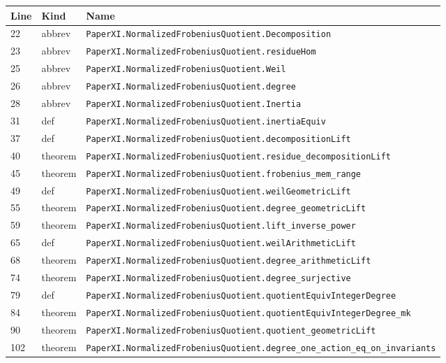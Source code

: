 \documentclass[10pt,oneside]{book}
\begin{document}
\begin{longtable}{@{}p{}p{}p{}@{}}\toprule Line&Kind&Name\\\midrule\endhead

22&abbrev&\nolinkurl{PaperXI.NormalizedFrobeniusQuotient.Decomposition}\\

23&abbrev&\nolinkurl{PaperXI.NormalizedFrobeniusQuotient.residueHom}\\

25&abbrev&\nolinkurl{PaperXI.NormalizedFrobeniusQuotient.Weil}\\

26&abbrev&\nolinkurl{PaperXI.NormalizedFrobeniusQuotient.degree}\\

28&abbrev&\nolinkurl{PaperXI.NormalizedFrobeniusQuotient.Inertia}\\

31&def&\nolinkurl{PaperXI.NormalizedFrobeniusQuotient.inertiaEquiv}\\

37&def&\nolinkurl{PaperXI.NormalizedFrobeniusQuotient.decompositionLift}\\

40&theorem&\nolinkurl{PaperXI.NormalizedFrobeniusQuotient.residue_decompositionLift}\\

45&theorem&\nolinkurl{PaperXI.NormalizedFrobeniusQuotient.frobenius_mem_range}\\

49&def&\nolinkurl{PaperXI.NormalizedFrobeniusQuotient.weilGeometricLift}\\

55&theorem&\nolinkurl{PaperXI.NormalizedFrobeniusQuotient.degree_geometricLift}\\

59&theorem&\nolinkurl{PaperXI.NormalizedFrobeniusQuotient.lift_inverse_power}\\

65&def&\nolinkurl{PaperXI.NormalizedFrobeniusQuotient.weilArithmeticLift}\\

68&theorem&\nolinkurl{PaperXI.NormalizedFrobeniusQuotient.degree_arithmeticLift}\\

74&theorem&\nolinkurl{PaperXI.NormalizedFrobeniusQuotient.degree_surjective}\\

79&def&\nolinkurl{PaperXI.NormalizedFrobeniusQuotient.quotientEquivIntegerDegree}\\

84&theorem&\nolinkurl{PaperXI.NormalizedFrobeniusQuotient.quotientEquivIntegerDegree_mk}\\

90&theorem&\nolinkurl{PaperXI.NormalizedFrobeniusQuotient.quotient_geometricLift}\\

102&theorem&\nolinkurl{PaperXI.NormalizedFrobeniusQuotient.degree_one_action_eq_on_invariants}\\

\bottomrule\end{longtable}
\end{document}

